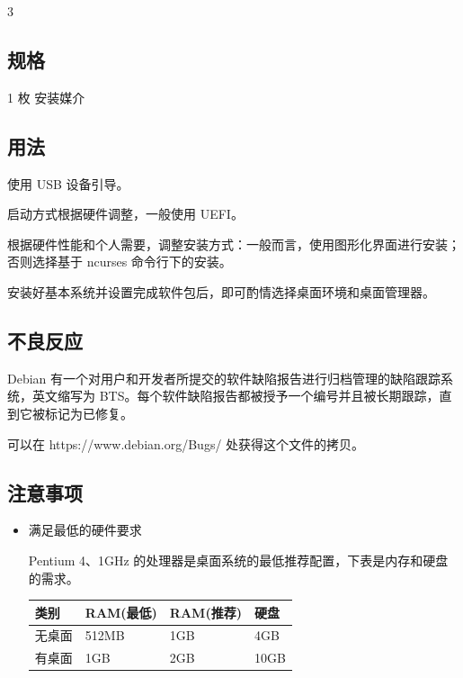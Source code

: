 \documentclass{article}
\begin{document}
\begin{multicols*}{3}
	\begin{tcolorbox}
	\section*{规格}
	\end{tcolorbox}

	1 枚 安装媒介

	\medskip

	\begin{tcolorbox}
	\section*{用法}
	\end{tcolorbox}

	使用 USB 设备引导。

	启动方式根据硬件调整，一般使用 UEFI。

	根据硬件性能和个人需要，调整安装方式：一般而言，使用图形化界面进行安装；否则选择基于 ncurses 命令行下的安装。

	安装好基本系统并设置完成软件包后，即可酌情选择桌面环境和桌面管理器。

	\medskip

	\begin{tcolorbox}
	\section*{不良反应}
	\end{tcolorbox}

	Debian 有一个对用户和开发者所提交的软件缺陷报告进行归档管理的缺陷跟踪系统，英文缩写为 BTS。每个软件缺陷报告都被授予一个编号并且被长期跟踪，直到它被标记为已修复。

	可以在 https://www.debian.org/Bugs/ 处获得这个文件的拷贝。

	\medskip


	\begin{tcolorbox}
	\section*{注意事项}
	\end{tcolorbox}
	\begin{itemize}[leftmargin=*]

		\item 满足最低的硬件要求

		Pentium 4、1GHz 的处理器是桌面系统的最低推荐配置，下表是内存和硬盘的需求。

		{\small\begin{tabularx}{\linewidth}{|X|X|X|X|}
			\hline
			类别 & RAM\newline (最低) & RAM\newline (推荐) & 硬盘 \\
			\hline
			无桌面 & 512MB & 1GB & 4GB \\
			\hline
			有桌面 & 1GB & 2GB & 10GB \\
			\hline
		\end{tabularx}}


\end{itemize}
\end{multicols*}
\end{document}
